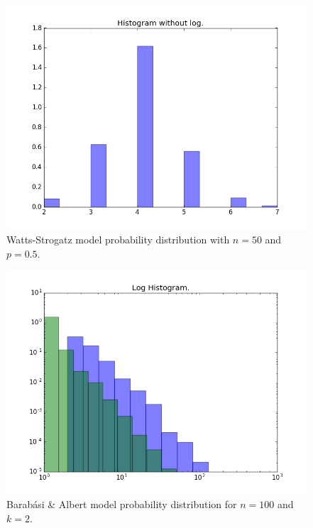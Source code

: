 \documentclass[12pt,a4paper,oneside]{article}
\numberwithin{equation}{section}
\numberwithin{equation}{section}
\theoremstyle{definition}
\begin{document}
\begin{figure}[h!]
	\centering
	\includegraphics[scale=1]{plots/WSemp.png}
	\caption{Watts-Strogatz model probability distribution with $n=50$ and $p=0.5$.}
	\label{WS}
\end{figure}

\begin{figure}[h!]
	\centering
	\includegraphics[scale=1]{plots/BAempvstheo.png}
	\caption{Barabási \& Albert model probability distribution for $n=100$ and $k=2$.}
	\label{ba}
\end{figure}
\end{document}
